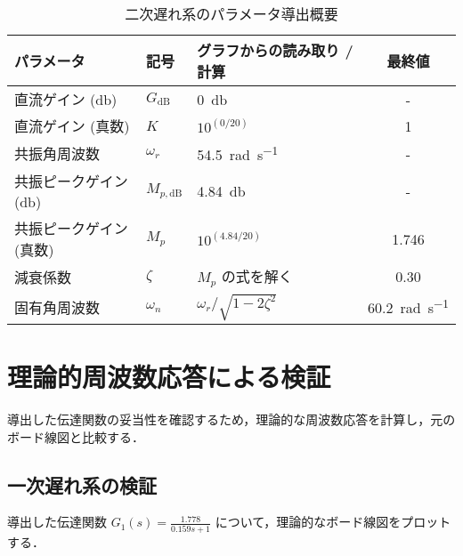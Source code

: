 \documentclass[11pt,a4paper]{ltjsarticle}
\begin{document}
\begin{table}[htbp]
  \centering
  \caption{二次遅れ系のパラメータ導出概要}
  \label{tbl:param2}
  \begin{tabular}{@{}lllc@{}}
    \toprule
    パラメータ & 記号 & グラフからの読み取り / 計算 & 最終値 \\
    \midrule
    直流ゲイン (\si{\decibel}) & $G_{\text{dB}}$ & \SI{0}{\decibel} & - \\
    直流ゲイン (真数) & $K$ & $10^{(0/20)}$ & 1 \\
    共振角周波数 & $\omega_r$ & \SI{54.5}{\radian\per\second} & - \\
    共振ピークゲイン (\si{\decibel}) & $M_{p,\text{dB}}$ & \SI{4.84}{\decibel} & - \\
    共振ピークゲイン (真数) & $M_p$ & $10^{(4.84/20)}$ & 1.746 \\
    減衰係数 & $\zeta$ & $M_p$ の式を解く & 0.30 \\
    固有角周波数 & $\omega_n$ & $\omega_r/\sqrt{1-2\zeta^2}$ & \SI{60.2}{\radian\per\second} \\
    \bottomrule
  \end{tabular}
\end{table}

\section{理論的周波数応答による検証}

導出した伝達関数の妥当性を確認するため，理論的な周波数応答を計算し，元のボード線図と比較する．

\subsection{一次遅れ系の検証}

導出した伝達関数 $G_1(s) = \frac{1.778}{0.159s+1}$ について，理論的なボード線図をプロットする．
\end{document}
